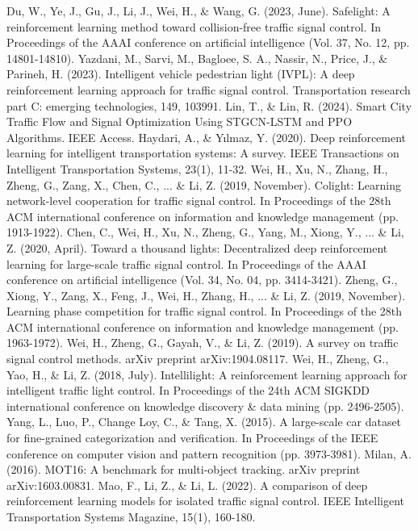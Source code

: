 \documentclass[conference]{IEEEtran}
\begin{document}
\begin{thebibliography}{00}
 Du, W., Ye, J., Gu, J., Li, J., Wei, H., \& Wang, G. (2023, June). Safelight: A reinforcement learning method toward collision-free traffic signal control. In Proceedings of the AAAI conference on artificial intelligence (Vol. 37, No. 12, pp. 14801-14810).
 Yazdani, M., Sarvi, M., Bagloee, S. A., Nassir, N., Price, J., \& Parineh, H. (2023). Intelligent vehicle pedestrian light (IVPL): A deep reinforcement learning approach for traffic signal control. Transportation research part C: emerging technologies, 149, 103991.
 Lin, T., \& Lin, R. (2024). Smart City Traffic Flow and Signal Optimization Using STGCN-LSTM and PPO Algorithms. IEEE Access.
 Haydari, A., \& Yılmaz, Y. (2020). Deep reinforcement learning for intelligent transportation systems: A survey. IEEE Transactions on Intelligent Transportation Systems, 23(1), 11-32.
 Wei, H., Xu, N., Zhang, H., Zheng, G., Zang, X., Chen, C., ... \& Li, Z. (2019, November). Colight: Learning network-level cooperation for traffic signal control. In Proceedings of the 28th ACM international conference on information and knowledge management (pp. 1913-1922).
 Chen, C., Wei, H., Xu, N., Zheng, G., Yang, M., Xiong, Y., ... \& Li, Z. (2020, April). Toward a thousand lights: Decentralized deep reinforcement learning for large-scale traffic signal control. In Proceedings of the AAAI conference on artificial intelligence (Vol. 34, No. 04, pp. 3414-3421).
 Zheng, G., Xiong, Y., Zang, X., Feng, J., Wei, H., Zhang, H., ... \& Li, Z. (2019, November). Learning phase competition for traffic signal control. In Proceedings of the 28th ACM international conference on information and knowledge management (pp. 1963-1972).
 Wei, H., Zheng, G., Gayah, V., \& Li, Z. (2019). A survey on traffic signal control methods. arXiv preprint arXiv:1904.08117.
 Wei, H., Zheng, G., Yao, H., \& Li, Z. (2018, July). Intellilight: A reinforcement learning approach for intelligent traffic light control. In Proceedings of the 24th ACM SIGKDD international conference on knowledge discovery \& data mining (pp. 2496-2505).
 Yang, L., Luo, P., Change Loy, C., \& Tang, X. (2015). A large-scale car dataset for fine-grained categorization and verification. In Proceedings of the IEEE conference on computer vision and pattern recognition (pp. 3973-3981).
 Milan, A. (2016). MOT16: A benchmark for multi-object tracking. arXiv preprint arXiv:1603.00831.
 Mao, F., Li, Z., \& Li, L. (2022). A comparison of deep reinforcement learning models for isolated traffic signal control. IEEE Intelligent Transportation Systems Magazine, 15(1), 160-180.

\end{thebibliography}
\end{document}
